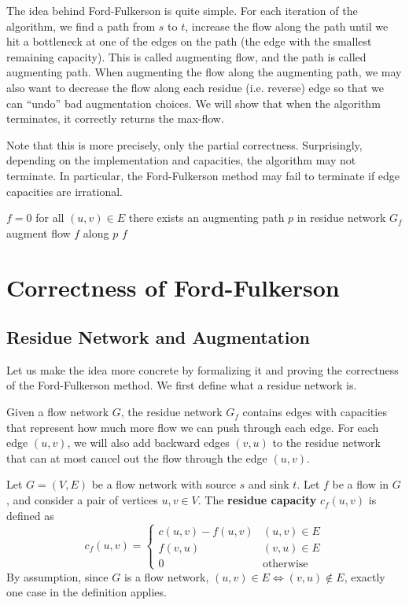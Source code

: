 The idea behind Ford-Fulkerson is quite simple. For each iteration of the algorithm, we find a path from $s$ to $t$, increase the flow along the path until we hit a bottleneck at one of the edges on the path (the edge with the smallest remaining capacity). This is called augmenting flow, and the path is called augmenting path. When augmenting the flow along the augmenting path, we may also want to decrease the flow along each residue (i.e. reverse) edge so that we can ``undo'' bad augmentation choices. We will show that when the algorithm terminates, it correctly returns the max-flow.

Note that this is more precisely, only the partial correctness. Surprisingly, depending on the implementation and capacities, the algorithm may not terminate. In particular, the Ford-Fulkerson method may fail to terminate if edge capacities are irrational.

\begin{codebox}
    \li $f = 0$ for all $(u,v) \in E$ 
    \li \While there exists an augmenting path $p$ in residue network $G_f$ \Do
        \li augment flow $f$ along $p$
    \End
    \li \Return $f$
\end{codebox}

\section{Correctness of Ford-Fulkerson}

\subsection{Residue Network and Augmentation}

Let us make the idea more concrete by formalizing it and proving the correctness of the Ford-Fulkerson method. We first define what a residue network is.

Given a flow network $G$, the residue network $G_f$ contains edges with capacities that represent how much more flow we can push through each edge. For each edge $(u,v)$, we will also add backward edges $(v,u)$ to the residue network that can at most cancel out the flow through the edge $(u,v)$.

\begin{definition} 
    Let $G=(V,E)$ be a flow network with source $s$ and sink $t$. Let $f$ be a flow in $G$, and consider a pair of vertices $u,v \in V$. The \textbf{residue capacity} $c_f(u,v)$ is defined as
    $$
    c_f(u,v) = \begin{cases}
        c(u,v) - f(u,v) & (u,v) \in E \\
        f(v,u) & (v,u) \in E \\
        0 & \text{otherwise}
    \end{cases}
    $$
    By assumption, since $G$ is a flow network, $(u,v) \in E \iff (v,u) \not\in E$, exactly one case in the definition applies.
\end{definition}

